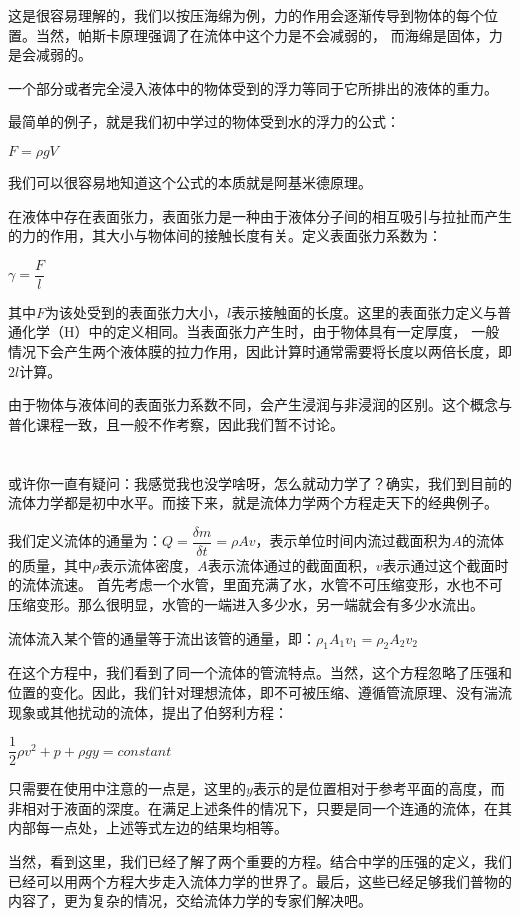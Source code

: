 这是很容易理解的，我们以按压海绵为例，力的作用会逐渐传导到物体的每个位置。当然，帕斯卡原理强调了在流体中这个力是不会减弱的，
而海绵是固体，力是会减弱的。
\begin{law}
    一个部分或者完全浸入液体中的物体受到的浮力等同于它所排出的液体的重力。
\end{law}

最简单的例子，就是我们初中学过的物体受到水的浮力的公式：
\begin{center}
    $F=\rho gV$
\end{center}

我们可以很容易地知道这个公式的本质就是阿基米德原理。

在液体中存在表面张力，表面张力是一种由于液体分子间的相互吸引与拉扯而产生的力的作用，其大小与物体间的接触长度有关。定义表面张力系数为：
\begin{center}
    $\gamma =\dfrac{F}{l}$
\end{center}

其中$F$为该处受到的表面张力大小，$l$表示接触面的长度。这里的表面张力定义与普通化学（H）中的定义相同。当表面张力产生时，由于物体具有一定厚度，
一般情况下会产生两个液体膜的拉力作用，因此计算时通常需要将长度以两倍长度，即$2l$计算。

由于物体与液体间的表面张力系数不同，会产生浸润与非浸润的区别。这个概念与普化课程一致，且一般不作考察，因此我们暂不讨论。
\section[流体动力学]{}
或许你一直有疑问：我感觉我也没学啥呀，怎么就动力学了？确实，我们到目前的流体力学都是初中水平。而接下来，就是流体力学两个方程走天下的经典例子。

我们定义流体的通量为：$Q=\dfrac{\delta m}{\delta t}=\rho Av$，表示单位时间内流过截面积为$A$的流体的质量，其中$\rho$表示流体密度，$A$表示流体通过的截面面积，$v$表示通过这个截面时的流体流速。
首先考虑一个水管，里面充满了水，水管不可压缩变形，水也不可压缩变形。那么很明显，水管的一端进入多少水，另一端就会有多少水流出。
\begin{law}
    流体流入某个管的通量等于流出该管的通量，即：$\rho_1 A_1 v_1=\rho_2 A_2 v_2$
\end{law}

在这个方程中，我们看到了同一个流体的管流特点。当然，这个方程忽略了压强和位置的变化。因此，我们针对理想流体，即不可被压缩、遵循管流原理、没有湍流现象或其他扰动的流体，提出了伯努利方程：
\begin{law}
    \centering
    $\dfrac{1}{2}\rho v^2 +p+\rho gy=constant$
\end{law}

只需要在使用中注意的一点是，这里的$y$表示的是位置相对于参考平面的高度，而非相对于液面的深度。在满足上述条件的情况下，只要是同一个连通的流体，在其内部每一点处，上述等式左边的结果均相等。

当然，看到这里，我们已经了解了两个重要的方程。结合中学的压强的定义，我们已经可以用两个方程大步走入流体力学的世界了。最后，这些已经足够我们普物的内容了，更为复杂的情况，交给流体力学的专家们解决吧。